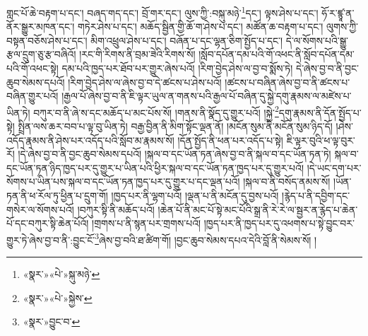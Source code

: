 གླང་པོ་ཆེ་བརྟག་པ་དང་། བཞད་གད་དང་། བྲོ་གར་དང་། ལུས་ཀྱི་:བསྐུ་མཉེ་\footnote{«སྣར་»«པེ་»སྐུ་མཉེ་}དང་། ལྟས་ཤེས་པ་དང་། ཧོ་ར་ཛྙཱ་ན་ནོར་སྒྱུར་མཁན་དང་། གཏེར་ཤེས་པ་དང་། མཆོད་སྦྱིན་གྱི་ཆོ་ག་ཤེས་པ་དང་། མཚོན་ཆ་བརྟག་པ་དང་། ལུགས་ཀྱི་བསྟན་བཅོས་ཤེས་པ་དང་། མིག་འཕྲུལ་ཤེས་པ་དང་། བཞོན་པ་དང་ལྷན་ཅིག་སྤྱོད་པ་དང་། དེ་ལ་སོགས་པའི་སྒྱུ་རྩལ་དྲུག་ཅུ་རྩ་བཞིའོ། །རང་གི་རིགས་ནི་བྲམ་ཟེའི་རིགས་སོ། །སློབ་དཔོན་དམ་པའི་གོ་འཕང་ནི་སློབ་དཔོན་དམ་པའི་གོ་འཕང་སྟེ། དམ་པའི་ཁྱད་པར་ཐོབ་པར་གྱུར་ཞེས་པའོ། །རིག་བྱེད་ཤེས་ལ་བྱ་བ་སྨོས་ཏེ། དེ་ཞེས་བྱ་བ་ནི་བྱང་ཆུབ་སེམས་དཔའོ། །རིག་བྱེད་ཤེས་ལ་ཞེས་བྱ་བ་དེ་ཚངས་པ་ཤེས་པའོ། །ཚངས་པ་བཞིན་ཞེས་བྱ་བ་ནི་ཚངས་པ་བཞིན་གྱུར་པའོ། །རྒྱལ་པོ་ཞེས་བྱ་བ་ནི་ཇི་ལྟར་ཡུལ་ན་གནས་པའི་རྒྱལ་པོ་བཞིན་དུ་སྐྱེ་དགུ་རྣམས་ལ་མཛེས་པ་ཡིན་ཏེ། བཀུར་བ་ནི་ཞེ་ས་དང་མཆོད་པ་མང་པོས་སོ། །གནས་ནི་སྣོད་དུ་གྱུར་པའོ། །སྐྱེ་\footnote{«སྣར་»«པེ་»སྐྱེས་}དགུ་རྣམས་ནི་དོན་སྤྱོད་པ་སྟེ། སྤྲིན་ལས་ཆར་བབ་པ་ལྟ་བུ་ཡིན་ཏེ། བརྒྱ་བྱིན་ནི་མིག་སྟོང་ལྡན་ནོ། །མངོན་སུམ་ནི་མངོན་སུམ་ཉིད་དོ། །ཤེས་འདོད་རྣམས་ནི་ཤེས་པར་འདོད་པའི་སློབ་མ་རྣམས་སོ། །དོན་སྤྱོད་ནི་ཕན་པར་འདོད་པ་སྟེ། ཇི་ལྟར་བུའི་ཕ་ལྟ་བུར་རོ། །དེ་ཞེས་བྱ་བ་ནི་བྱང་ཆུབ་སེམས་དཔའོ། །སྐལ་བ་དང་ཡོན་ཏན་ཞེས་བྱ་བ་ནི་སྐལ་བ་དང་ཡོན་ཏན་ཏེ། སྐལ་བ་དང་ཡོན་ཏན་ཉིད་ཁྱད་པར་དུ་གྱུར་པ་ཡིན་པའི་ཕྱིར་སྐལ་བ་དང་ཡོན་ཏན་ཁྱད་པར་དུ་གྱུར་པའོ། །དེ་ཡང་དག་པར་སོགས་པ་ཡིན་པས་སྐལ་བ་དང་ཡོན་ཏན་ཁྱད་པར་དུ་གྱུར་པ་དང་ལྡན་པའོ། །སྐལ་བ་ནི་བསོད་ནམས་སོ། །ཡོན་ཏན་ནི་ཕ་རོལ་ཏུ་ཕྱིན་པ་དྲུག་གོ། །ཁྱད་པར་ནི་ལྷག་པའོ། །ལྡན་པ་ནི་མངོན་དུ་བྱས་པའོ། །རྙེད་པ་ནི་དབྱིག་དང་གསེར་ལ་སོགས་པའོ། །བཀུར་སྟི་ནི་མཆོད་པའོ། །ཆེན་པོ་ནི་མང་པོ་སྟེ་མང་པོའི་སྒྲ་ནི་རེ་རེ་ལ་སྦྱར་ན་རྙེད་པ་ཆེན་པོ་དང་བཀུར་སྟི་ཆེན་པོའོ། །གྲགས་པ་ནི་སྙན་པར་གྲགས་པའོ། །ཁྱད་པར་ནི་ཁྱད་པར་དུ་འཕགས་པ་སྟེ་བྱུང་བར་གྱུར་ཏེ་ཞེས་བྱ་བ་ནི་:བྱུང་ངོ་\footnote{«སྣར་»བྱུང་བ་}ཞེས་བྱ་བའི་ཐ་ཚིག་གོ། །བྱང་ཆུབ་སེམས་དཔའ་དེའི་བློ་ནི་སེམས་སོ། །

